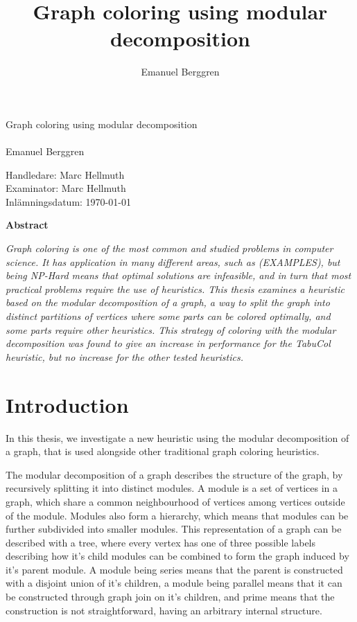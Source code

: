 \documentclass[a4paper]{article}
\author{Emanuel Berggren}
\title{Graph coloring using modular decomposition}
\newcommand{\Framsida}{\AddToShipoutPicture*{\put(0,0){\texttt{[image: kandidatfram.pdf]}}}}
\begin{document}
\Framsida 
\vspace*{4cm}
\Huge{Graph coloring using modular decomposition}\\\\ %
\Large{Emanuel Berggren} %

\vspace*{12cm}
\Large{Handledare: Marc Hellmuth} \\ 
\Large{Examinator: Marc Hellmuth} \\ 
\Large{Inlämningsdatum: \today}\\

\begin{center}
	\textbf{Abstract}
\end{center}
\textit{
Graph coloring is one of the most common and studied problems in computer
science. It has application in many different areas, such as (EXAMPLES), but
being NP-Hard means that optimal solutions are infeasible, and in turn that most
practical problems require the use of heuristics. This thesis examines a
heuristic based on the modular decomposition of a graph, a way to split the graph
into distinct partitions of vertices where some parts can be colored optimally,
and some parts require other heuristics. This strategy of coloring with the
modular decomposition was found to give an increase in performance for the
TabuCol heuristic, but no increase for the other tested heuristics.
}




\tableofcontents

\section{Introduction}

In this thesis, we investigate a new heuristic using the modular decomposition of
a graph, that is used alongside other traditional graph coloring heuristics.

The modular decomposition of a graph describes the structure of the graph, by
recursively splitting it into distinct modules. A module is a set of vertices in
a graph, which share a common neighbourhood of vertices among vertices outside
of the module. Modules also form a hierarchy, which means that modules can be
further subdivided into smaller modules. This representation of a graph can be
described with a tree, where every vertex has one of three possible labels
describing how it's child modules can be combined to form the graph induced by
it's parent module. A module being series means that the parent is constructed
with a disjoint union of it's children, a module being parallel means that it
can be constructed through graph join on it's children, and prime means that the
construction is not straightforward, having an arbitrary internal structure.
\end{document}
